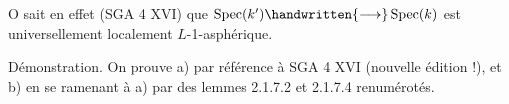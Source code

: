O sait en effet (SGA 4 XVI\quad\quad) que $\operatorname{Spec}(k')\handwritten{\longrightarrow}\operatorname{Spec}(k)$ est universellement localement \uline{$L$}-1-asphérique.

Démonstration. On prouve a) par référence à SGA 4 XVI (nouvelle édition !), et b) en se ramenant à a) par des lemmes 2.1.7.2 et 2.1.7.4 renumérotés.

